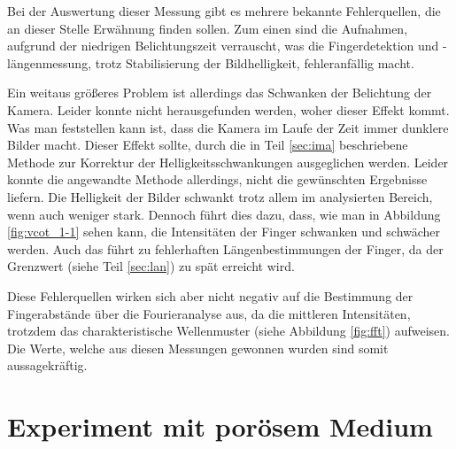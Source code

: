 Bei der Auswertung dieser Messung gibt es mehrere bekannte Fehlerquellen, die an dieser Stelle Erwähnung finden sollen. Zum einen sind die Aufnahmen, aufgrund der niedrigen Belichtungszeit verrauscht, was die Fingerdetektion und -längenmessung, trotz Stabilisierung der Bildhelligkeit, fehleranfällig macht.

Ein weitaus größeres Problem ist allerdings das Schwanken der Belichtung der Kamera. Leider konnte nicht herausgefunden werden, woher dieser Effekt kommt. Was man feststellen kann ist, dass die Kamera im Laufe der Zeit immer dunklere Bilder macht. Dieser Effekt sollte, durch die in Teil \ref{sec:ima} beschriebene Methode zur Korrektur der Helligkeitsschwankungen ausgeglichen werden. Leider konnte die angewandte Methode allerdings, nicht die gewünschten Ergebnisse liefern. Die Helligkeit der Bilder schwankt trotz allem im analysierten Bereich, wenn auch weniger stark. Dennoch führt dies dazu, dass, wie man in Abbildung \ref{fig:vcot_1-1} sehen kann, die Intensitäten der Finger schwanken und schwächer werden. Auch das führt zu fehlerhaften Längenbestimmungen der Finger, da der Grenzwert (siehe Teil \ref{sec:lan}) zu spät erreicht wird.

Diese Fehlerquellen wirken sich aber nicht negativ auf die Bestimmung der Fingerabstände über die Fourieranalyse aus, da die mittleren Intensitäten, trotzdem das charakteristische Wellenmuster (siehe Abbildung \ref{fig:fft}) aufweisen. Die Werte, welche aus diesen Messungen gewonnen wurden sind somit aussagekräftig.



% 
% 


\newpage

\section{\COTm Experiment mit porösem Medium}
\label{res:cpm}

